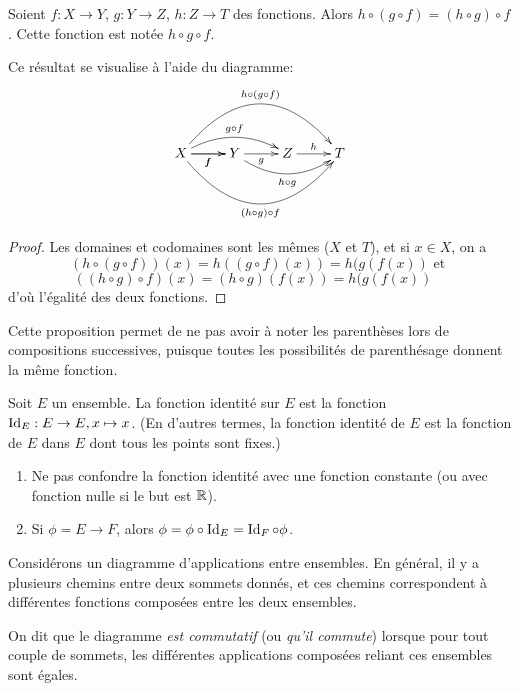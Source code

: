 \begin{proposition}
Soient $f : X\to Y$, $g : Y\to Z$, $h  : Z\to T$ des fonctions. Alors $h\circ (g\circ f) = (h\circ g)\circ f$. Cette fonction est notée $h\circ g\circ f$.

Ce résultat se visualise à l'aide du diagramme:
\[
\xymatrix{
X \ar[r]_{f} \ar@/^1pc/[rr]^{g\circ f} \ar[r]_{f} \ar@/^3pc/[rrr]^{h\circ (g\circ f)} \ar@/_3pc/[rrr]_{(h\circ g) \circ f}& Y \ar[r]_{g} \ar@/_1.2pc/[rr]_{h\circ g} & Z \ar[r]^{h} & T
}
\]

\end{proposition}
\begin{proof}
Les domaines et codomaines sont les mêmes ($X$ et $T$), et si $x\in X$, on a 
\[ \left(h\circ (g\circ f)\right) (x) = h((g\circ f)(x)) = h(g(f(x)) \text{ et } \]
\[ \left( (h\circ g)\circ f \right) (x) = (h \circ g)(f(x)) = h(g(f(x))\quad \]
d'où l'égalité des deux fonctions.
\end{proof}

Cette proposition permet de ne pas avoir à noter les parenthèses lors de compositions successives, puisque toutes les possibilités de parenthésage donnent la même fonction.

\begin{definition}
Soit $E$ un ensemble. La fonction identité sur $E$ est la fonction $\operatorname{Id}_E : E\to E, x\mapsto x$. (En d'autres termes, la fonction identité de $E$ est la fonction de $E$ dans $E$ dont tous les points sont fixes.)
\end{definition}

\begin{attention}
\begin{enumerate}
\item Ne pas confondre la fonction identité avec une fonction constante (ou avec fonction nulle si le but est $\mathbb{R}$).
\item Si $\phi = E\to F$, alors $\phi = \phi\circ \operatorname{Id}_E = \operatorname{Id}_F\circ \phi$.
\end{enumerate}
\end{attention}


\begin{definition}
Considérons un diagramme d'applications entre ensembles. En général, il y a plusieurs chemins entre deux sommets donnés, et ces chemins correspondent à différentes fonctions composées entre les deux ensembles.

On dit que le diagramme \emph{est commutatif} (ou \emph{qu'il commute}) lorsque pour tout couple de sommets, les différentes applications composées reliant ces ensembles sont égales.
\end{definition}

